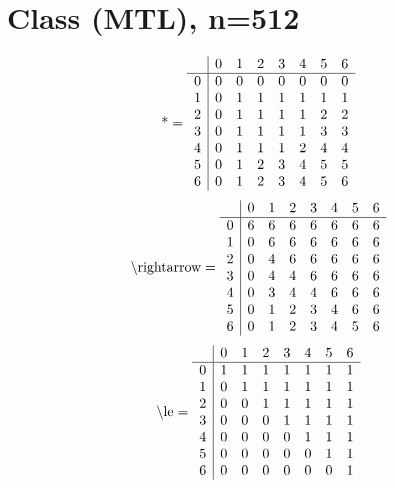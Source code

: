 \documentclass[11pt]{article}
\begin{document}
\section{Class (MTL), n=512}
\[\text{*} = 
\begin{array}{r | r r r r r r r}
 & 0 & 1 & 2 & 3 & 4 & 5 & 6 \\ \hline
0 & 0 & 0 & 0 & 0 & 0 & 0 & 0 \\
1 & 0 & 1 & 1 & 1 & 1 & 1 & 1 \\
2 & 0 & 1 & 1 & 1 & 1 & 2 & 2 \\
3 & 0 & 1 & 1 & 1 & 1 & 3 & 3 \\
4 & 0 & 1 & 1 & 1 & 2 & 4 & 4 \\
5 & 0 & 1 & 2 & 3 & 4 & 5 & 5 \\
6 & 0 & 1 & 2 & 3 & 4 & 5 & 6 \\
\end{array}
\]
\[\text{\textbackslash rightarrow} = 
\begin{array}{r | r r r r r r r}
 & 0 & 1 & 2 & 3 & 4 & 5 & 6 \\ \hline
0 & 6 & 6 & 6 & 6 & 6 & 6 & 6 \\
1 & 0 & 6 & 6 & 6 & 6 & 6 & 6 \\
2 & 0 & 4 & 6 & 6 & 6 & 6 & 6 \\
3 & 0 & 4 & 4 & 6 & 6 & 6 & 6 \\
4 & 0 & 3 & 4 & 4 & 6 & 6 & 6 \\
5 & 0 & 1 & 2 & 3 & 4 & 6 & 6 \\
6 & 0 & 1 & 2 & 3 & 4 & 5 & 6 \\
\end{array}
\]
\[\text{\textbackslash le} = 
\begin{array}{r | r r r r r r r}
 & 0 & 1 & 2 & 3 & 4 & 5 & 6 \\ \hline
0 & 1 & 1 & 1 & 1 & 1 & 1 & 1 \\
1 & 0 & 1 & 1 & 1 & 1 & 1 & 1 \\
2 & 0 & 0 & 1 & 1 & 1 & 1 & 1 \\
3 & 0 & 0 & 0 & 1 & 1 & 1 & 1 \\
4 & 0 & 0 & 0 & 0 & 1 & 1 & 1 \\
5 & 0 & 0 & 0 & 0 & 0 & 1 & 1 \\
6 & 0 & 0 & 0 & 0 & 0 & 0 & 1 \\
\end{array}
\]
\end{document}
